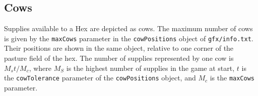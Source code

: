 \documentclass[12pt,ebook,oneside]{book}
\begin{document}
\subsection{Cows}

Supplies available to a Hex are depicted as cows. The maximum number
of cows is given by the \texttt{maxCows} parameter in the
\texttt{cowPositions} object of \texttt{gfx/info.txt}. Their positions
are shown in the same object, relative to one corner of the pasture
field of the hex. The number of supplies represented by one cow is
$M_st/M_c$, where $M_S$ is the highest number of supplies in the game
at start, $t$ is the \texttt{cowTolerance} parameter of the
\texttt{cowPositions} object, and $M_c$ is the \texttt{maxCows}
parameter. 
\end{document}
